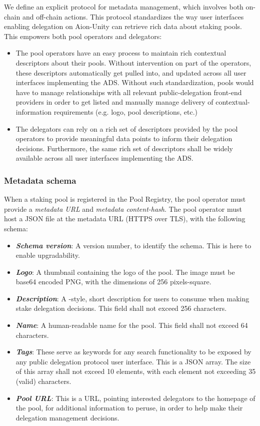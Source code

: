 We define an explicit protocol for metadata management, which involves both on-chain and off-chain actions. This protocol standardizes the way user interfaces enabling delegation on Aion-Unity can retrieve rich data about staking pools. This empowers both pool operators and delegators: 
\begin{itemize}
    \item The pool operators have an easy process to maintain rich contextual descriptors about their pools. Without intervention on part of the operators, these descriptors automatically get pulled into, and updated across all user interfaces implementing the ADS. Without such standardization, pools would have to manage relationships with all relevant public-delegation front-end providers in order to get listed and manually manage delivery of contextual-information requirements (e.g. logo, pool descriptions, etc.) 
    \item The delegators can rely on a rich set of descriptors provided by the pool operators to provide meaningful data points to inform their delegation decisions. Furthermore, the same rich set of descriptors shall be widely available across all user interfaces implementing the ADS.  
\end{itemize}

\subsubsection{Metadata schema}
When a staking pool is registered in the Pool Registry, the pool operator must provide a \textit{metadata URL} and \textit{metadata content-hash}. The pool operator must host a JSON file at the metadata URL (HTTPS over TLS), with the following schema: 
\begin{itemize}[label=--,nosep]
    \item \textit{\textbf{Schema version}}: A version number, to identify the schema. This is here to enable upgradability. 
    \item \textit{\textbf{Logo}}: A thumbnail containing the logo of the pool. The image must be base64 encoded PNG, with the dimensions of 256 pixels-square.
    \item \textit{\textbf{Description}}: A -style, short description for users to consume when making stake delegation decisions. This field shall not exceed 256 characters.
    \item \textit{\textbf{Name}}: A human-readable name for the pool. This field shall not exceed 64 characters.
    \item \textit{\textbf{Tags}}: These serve as keywords for any search functionality to be exposed by any public delegation protocol user interface. This is a JSON array. The size of this array shall not exceed 10 elements, with each element not exceeding 35 (valid) characters.
    \item \textit{\textbf{Pool URL}}: This is a URL, pointing interested delegators to the homepage of the pool, for additional information to peruse, in order to help make their delegation management decisions. 
\end{itemize}

